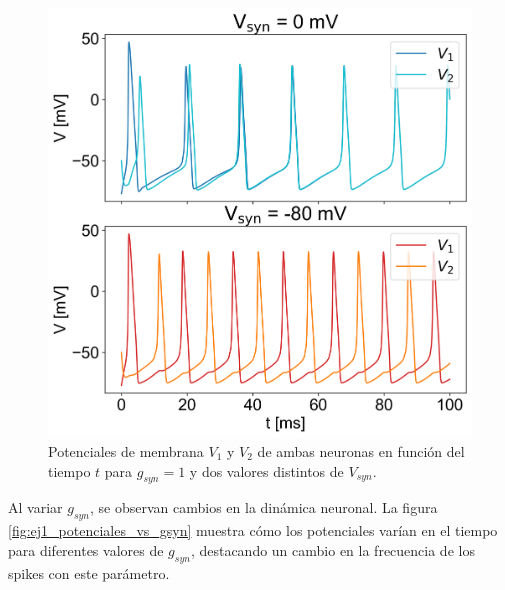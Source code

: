 \documentclass[aps,prb,twocolumn,superscriptaddress,floatfix,longbibliography]{revtex4-2}
\newcounter{para}
\begin{document}
\begin{figure}[h]
    \includegraphics[clip=true,width=\columnwidth]{ej1_potenciales_vs_Vsyn}
    \caption{Potenciales de membrana $V_1$ y $V_2$ de ambas neuronas en función del tiempo $t$ para $g_{syn} = 1$ y dos valores distintos de $V_{syn}$.}
     \label{fig:ej1_potenciales_vs_Vsyn}
\end{figure}

Al variar \(g_{syn}\), se observan cambios en la dinámica neuronal. La figura \ref{fig:ej1_potenciales_vs_gsyn} muestra cómo los potenciales varían en el tiempo para diferentes valores de \(g_{syn}\), destacando un cambio en la frecuencia de los spikes con este parámetro.
\end{document}
